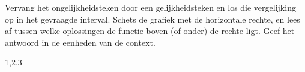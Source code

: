 \begin{werkwijze}
Vervang het ongelijkheidsteken door een gelijkheidsteken en los die vergelijking op in het gevraagde interval. Schets de grafiek met de horizontale rechte, en lees af tussen welke oplossingen de functie boven (of onder) de rechte ligt. Geef het antwoord in de eenheden van de context.
\end{werkwijze}

\begin{oefeningen}

\end{oefeningen}

\opdrachtenkop

\begin{oefeningen}
















\begin{alleenvoor}{1,2,3}


\end{alleenvoor}










\end{oefeningen}

